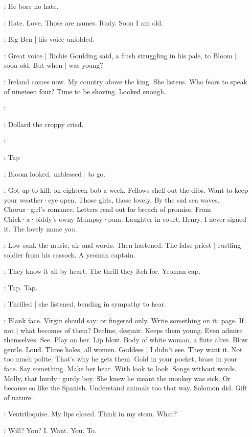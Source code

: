 :
He bore no hate.

\BloomInt:
Hate.
Love.
Those are names.
Rudy.
Soon I am old.

:
Big Ben |
his voice unfolded.

:
Great voice |
Richie Goulding said,
a flush struggling in his pale,
to Bloom |
soon old.
But when |
was young?

\BloomInt:
Ireland comes now.
My country above the king.
She listens.
Who fears to speak of nineteen four?
Time to be shoving.
Looked enough.

\dollard:

:
Dollard the croppy cried.

\dollard:

\stripling:
Tap

:
Bloom looked,
unblessed |
to go.

\BloomInt:
Got up to kill:
on eighteen bob a week.
Fellows shell out the dibs.
Want to keep your weather·eye open.
Those girls,
those lovely.
By the sad sea waves.
Chorus·girl's romance.
Letters read out for breach of promise.
From Chick·a·biddy's owny Mumpsy·pum.
Laughter in court.
Henry.
I never signed it.
The lovely name you.

:
Low sank the music,
air and words.
Then hastened.
The false priest |
rustling soldier from his cassock.
A yeoman captain.

\BloomInt:
They know it all by heart.
The thrill they itch for.
Yeoman cap.

\stripling:
Tap.
Tap.

:
Thrilled |
she listened,
bending in sympathy to hear.

\BloomInt:
Blank face.
Virgin should say:
or fingered only.
Write something on it:
page.
If not |
what becomes of them?
Decline,
despair.
Keeps them young.
Even admire themselves.
See.
Play on her.
Lip blow.
Body of white woman,
a flute alive.
Blow gentle.
Loud.
Three holes,
all women.
Goddess |
I didn't see.
They want it.
Not too much polite.
That's why he gets them.
Gold in your pocket,
brass in your face.
Say something.
Make her hear.
With look to look.
Songs without words.
Molly,
that hurdy·gurdy boy.
She knew he meant the monkey was sick.
Or because so like the Spanish.
Understand animals too that way.
Solomon did.
Gift of nature.

\BloomInt:
Ventriloquise.
My lips closed.
Think in my stom.
What?

\BloomInt:
Will?
You?
I\@.
Want.
You.
To.

